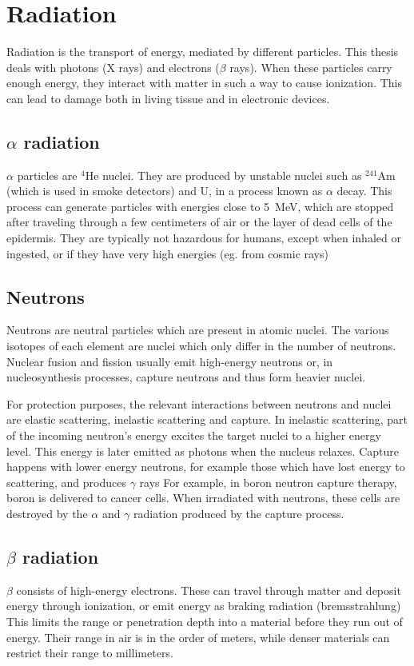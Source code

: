 \section{Radiation}
\label{sec:radiacion}
Radiation is the transport of energy, mediated by different particles.
This thesis deals with photons (X rays) and electrons ($\beta$ rays).
When these particles carry enough energy,
they interact with matter in such a way to cause ionization.
This can lead to damage both in living tissue and in electronic devices.
%
\subsection{$\alpha$ radiation}
$\alpha$ particles are $^4$He nuclei.
They are produced by unstable nuclei such as
$^{241}$Am (which is used in smoke detectors) and U,
in a process known as $\alpha$ decay.
This process can generate particles with energies close to
\SI{5}{\mega\electronvolt},
which are stopped after traveling through a few centimeters of air
or the layer of dead cells of the epidermis.
They are typically not hazardous for humans,
except when inhaled or ingested,
or if they have very high energies (eg. from cosmic rays)
\subsection{Neutrons}
Neutrons are neutral particles which are present in atomic nuclei.
The various isotopes of each element are nuclei which only differ in the number of neutrons.
Nuclear fusion and fission usually emit high-energy neutrons or,
in nucleosynthesis processes,
capture neutrons and thus form heavier nuclei.

For protection purposes, the relevant interactions between neutrons and nuclei
are elastic scattering, inelastic scattering and capture.
In inelastic scattering,
part of the incoming neutron's energy excites the target nuclei to a higher energy level.
This energy is later emitted as photons when the nucleus relaxes.
Capture happens with lower energy neutrons,
for example those which have lost energy to scattering,
and produces $\gamma$ rays
For example, in boron neutron capture therapy,
boron is delivered to cancer cells.
When irradiated with neutrons, these cells are destroyed
by the $\alpha$ and $\gamma$ radiation produced by the capture process.
\subsection{$\beta$ radiation}
$\beta$ consists of high-energy electrons.
These can travel through matter and deposit energy through ionization,
or emit energy as braking radiation (bremsstrahlung)
This limits the range or penetration depth into a material before they run out of energy.
Their range in air is in the order of meters,
while denser materials can restrict their range to millimeters.


